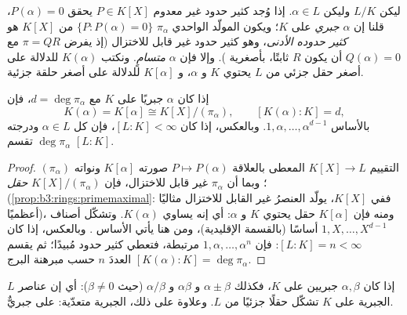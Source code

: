 \begin{definition}\label{def:b3:galois:algebraic}
ليكن $L/K$ وليكن $\alpha \in L$. إذا وُجد كثير حدود غير معدوم
$P \in K[X]$ يحقق $P(\alpha) = 0$، قلنا إن $\alpha$
\emph{جبري} على $K$؛ ويكون المولّد الواحدي
$\pi_\alpha$  $\{P : P(\alpha) = 0\}$ من $K[X]$ هو \emph{كثير حدوده
الأدنى}، وهو كثير حدود
غير قابل للاختزال (إذ يفرض $\pi = QR$ مع $Q(\alpha) = 0$ أن يكون
$R$ ثابتًا، بأصغرية ). وإلا فإن $\alpha$ \emph{متسامٍ}.
ونكتب $K(\alpha)$ للدلالة على أصغر حقل جزئي من $L$ يحتوي $K$
و $\alpha$، و $K[\alpha]$ للدلالة على أصغر حلقة جزئية.
\end{definition}

\begin{theorem}\label{thm:b3:galois:simple}
إذا كان $\alpha$ جبريًا على $K$ مع $d = \deg\pi_\alpha$، فإن
\[
K(\alpha) = K[\alpha] \cong K[X]/(\pi_\alpha),
\qquad [K(\alpha) : K] = d,
\]
بالأساس $1, \alpha, \dots, \alpha^{d-1}$. وبالعكس، إذا كان $[L:K] < \infty$، فإن كل
$\alpha \in L$  ودرجته $\deg \pi_\alpha$ تقسم $[L:K]$.
\end{theorem}

\begin{proof}
التقييم $K[X] \to L$ المعطى بالعلاقة $P \mapsto P(\alpha)$ صورته $K[\alpha]$ ونواته
$(\pi_\alpha)$؛ وبما أن $\pi_\alpha$ غير قابل للاختزال، فإن
$K[X]/(\pi_\alpha)$ \emph{حقل} (\cref{prop:b3:rings:primemaximal}: ففي 
$K[X]$، يولّد العنصرُ غير القابل للاختزال مثاليًا أعظميًا)، ومنه
فإن $K[\alpha]$ حقل يحتوي $K$ و $\alpha$: أي إنه يساوي
$K(\alpha)$. وتشكّل أصناف $1, X, \dots, X^{d-1}$ أساسًا  (بالقسمة
الإقليدية)، ومن هنا يأتي الأساس . وبالعكس، إذا كان $[L:K]
= n < \infty$:
فإن $1, \alpha, \dots, \alpha^n$ مرتبطة، فتعطي كثير حدود مُبيدًا؛ ثم يقسم $[K(\alpha):K] =
\deg\pi_\alpha$ العددَ
$n$ حسب مبرهنة البرج.
\end{proof}

\begin{corollary}\label{cor:b3:galois:algclosed}
إذا كان $\alpha, \beta$ جبريين على $K$، فكذلك $\alpha \pm
\beta$
و $\alpha\beta$ و $\alpha/\beta$ (حيث $\beta \ne 0$): أي إن عناصر
$L$ الجبرية على $K$ تشكّل حقلًا جزئيًا من $L$. وعلاوة على ذلك،
الجبرية متعدّية:  على  جبريٌّ.
\end{corollary}

